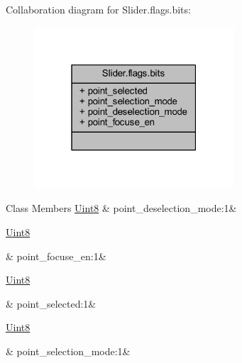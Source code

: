 Collaboration diagram for Slider.\+flags.\+bits\+:
\nopagebreak
\begin{figure}[H]
\begin{center}
\leavevmode
\includegraphics[width=211pt]{de/dd2/a00207}
\end{center}
\end{figure}
\begin{DoxyFields}{Class Members}
\hypertarget{a00025_a73ac9a976343cc1d8842ecd1bc1b2746}{\hyperlink{a00001_a979e3e23b9a449e69ab6a8a83b6042f8}{Uint8}}\label{a00025_a73ac9a976343cc1d8842ecd1bc1b2746}
&
point\+\_\+deselection\+\_\+mode\+:1&
\\
\hline

\hypertarget{a00025_aeae313367aca4002d5be6284009fd26a}{\hyperlink{a00001_a979e3e23b9a449e69ab6a8a83b6042f8}{Uint8}}\label{a00025_aeae313367aca4002d5be6284009fd26a}
&
point\+\_\+focuse\+\_\+en\+:1&
\\
\hline

\hypertarget{a00025_a6f35b78941cb8dc08585d215b05befa2}{\hyperlink{a00001_a979e3e23b9a449e69ab6a8a83b6042f8}{Uint8}}\label{a00025_a6f35b78941cb8dc08585d215b05befa2}
&
point\+\_\+selected\+:1&
\\
\hline

\hypertarget{a00025_a11d4438dc576a131ad6ca02f09621f1d}{\hyperlink{a00001_a979e3e23b9a449e69ab6a8a83b6042f8}{Uint8}}\label{a00025_a11d4438dc576a131ad6ca02f09621f1d}
&
point\+\_\+selection\+\_\+mode\+:1&
\\
\hline

\end{DoxyFields}


